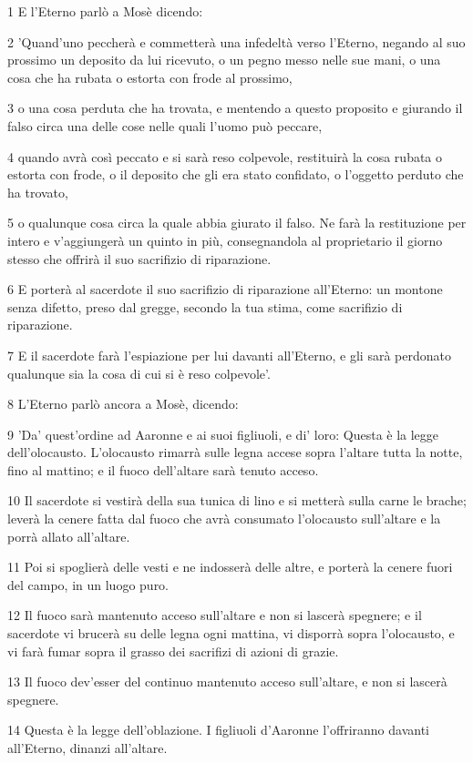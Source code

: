 \par 1 E l'Eterno parlò a Mosè dicendo:
\par 2 'Quand'uno peccherà e commetterà una infedeltà verso l'Eterno, negando al suo prossimo un deposito da lui ricevuto, o un pegno messo nelle sue mani, o una cosa che ha rubata o estorta con frode al prossimo,
\par 3 o una cosa perduta che ha trovata, e mentendo a questo proposito e giurando il falso circa una delle cose nelle quali l'uomo può peccare,
\par 4 quando avrà così peccato e si sarà reso colpevole, restituirà la cosa rubata o estorta con frode, o il deposito che gli era stato confidato, o l'oggetto perduto che ha trovato,
\par 5 o qualunque cosa circa la quale abbia giurato il falso. Ne farà la restituzione per intero e v'aggiungerà un quinto in più, consegnandola al proprietario il giorno stesso che offrirà il suo sacrifizio di riparazione.
\par 6 E porterà al sacerdote il suo sacrifizio di riparazione all'Eterno: un montone senza difetto, preso dal gregge, secondo la tua stima, come sacrifizio di riparazione.
\par 7 E il sacerdote farà l'espiazione per lui davanti all'Eterno, e gli sarà perdonato qualunque sia la cosa di cui si è reso colpevole'.
\par 8 L'Eterno parlò ancora a Mosè, dicendo:
\par 9 'Da' quest'ordine ad Aaronne e ai suoi figliuoli, e di' loro: Questa è la legge dell'olocausto. L'olocausto rimarrà sulle legna accese sopra l'altare tutta la notte, fino al mattino; e il fuoco dell'altare sarà tenuto acceso.
\par 10 Il sacerdote si vestirà della sua tunica di lino e si metterà sulla carne le brache; leverà la cenere fatta dal fuoco che avrà consumato l'olocausto sull'altare e la porrà allato all'altare.
\par 11 Poi si spoglierà delle vesti e ne indosserà delle altre, e porterà la cenere fuori del campo, in un luogo puro.
\par 12 Il fuoco sarà mantenuto acceso sull'altare e non si lascerà spegnere; e il sacerdote vi brucerà su delle legna ogni mattina, vi disporrà sopra l'olocausto, e vi farà fumar sopra il grasso dei sacrifizi di azioni di grazie.
\par 13 Il fuoco dev'esser del continuo mantenuto acceso sull'altare, e non si lascerà spegnere.
\par 14 Questa è la legge dell'oblazione. I figliuoli d'Aaronne l'offriranno davanti all'Eterno, dinanzi all'altare.
